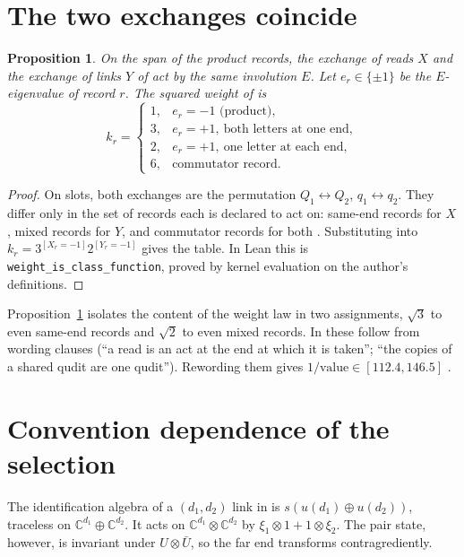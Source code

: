 \documentclass[11pt]{article}
\newcommand{\ident}[1]{\nolinkurl{#1}}
\newtheorem{proposition}{Proposition}
\theoremstyle{remark}
\begin{document}
\section{The two exchanges coincide}
\begin{proposition}\label{prop:class}
On the span of the product records, the exchange of reads $X$ and the exchange of links $Y$ of \cite{wg} act by the same involution $E$. Let $e_r\in\{\pm1\}$ be the $E$-eigenvalue of record $r$. The squared weight of \cite[Eq.~(5)]{wg} is
\[
k_r=\begin{cases}1,& e_r=-1 \text{ (product)},\\ 3,& e_r=+1,\ \text{both letters at one end},\\ 2,& e_r=+1,\ \text{one letter at each end},\\ 6,& \text{commutator record}.\end{cases}
\]
\end{proposition}
\begin{proof}
On slots, both exchanges are the permutation $Q_1\leftrightarrow Q_2$, $q_1\leftrightarrow q_2$. They differ only in the set of records each is declared to act on: same-end records for $X$, mixed records for $Y$, and commutator records for both \cite[Sec.~S7]{wg}. Substituting into $k_r=3^{[X_r=-1]}2^{[Y_r=-1]}$ gives the table. In Lean this is \ident{weight_is_class_function}, proved by kernel evaluation on the author's definitions.
\end{proof}
Proposition~\ref{prop:class} isolates the content of the weight law in two assignments, $\sqrt3$ to even same-end records and $\sqrt2$ to even mixed records. In \cite{wg} these follow from wording clauses (``a read is an act at the end at which it is taken''; ``the copies of a shared qudit are one qudit''). Rewording them gives $1/\text{value}\in[112.4,146.5]$ \cite[Table S5]{wg}.

\section{Convention dependence of the selection}
The identification algebra of a $(d_1,d_2)$ link in \cite{wg} is $s(u(d_1)\oplus u(d_2))$, traceless on $\mathbb C^{d_1}\oplus\mathbb C^{d_2}$. It acts on $\mathbb C^{d_1}\otimes\mathbb C^{d_2}$ by $\xi_1\otimes 1+1\otimes\xi_2$. The pair state, however, is invariant under $U\otimes\bar U$, so the far end transforms contragrediently.
\end{document}
